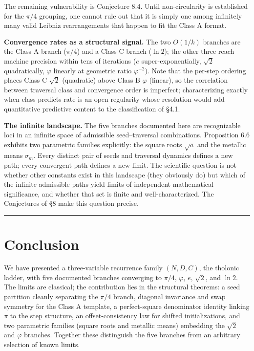 \documentclass[12pt]{article}
\begin{document}
The remaining vulnerability is Conjecture 8.4. Until non-circularity is
established for the \(\pi/4\) grouping, one cannot rule out that it is
simply one among infinitely many valid Leibniz rearrangements that
happen to fit the Class A format.

\textbf{Convergence rates as a structural signal.} The two \(O(1/k)\)
branches are the Class A branch (\(\pi/4\)) and a Class C branch
(\(\ln 2\)); the other three reach machine precision within tens of
iterations (\(e\) super-exponentially, \(\sqrt{2}\) quadratically,
\(\varphi\) linearly at geometric ratio \(\varphi^{-2}\)). Note that the
per-step ordering places Class C \(\sqrt{2}\) (quadratic) above Class B
\(\varphi\) (linear), so the correlation between traversal class and
convergence order is imperfect; characterizing exactly when class
predicts rate is an open regularity whose resolution would add
quantitative predictive content to the classification of §4.1.

\textbf{The infinite landscape.} The five branches documented here are
recognizable loci in an infinite space of admissible seed--traversal
combinations. Proposition 6.6 exhibits two parametric families
explicitly: the square roots \(\sqrt{a}\) and the metallic means
\(\sigma_m\). Every distinct pair of seeds and traversal dynamics
defines a new path; every convergent path defines a new limit. The
scientific question is not whether other constants exist in this
landscape (they obviously do) but which of the infinite admissible paths
yield limits of independent mathematical significance, and whether that
set is finite and well-characterized. The Conjectures of §8 make this
question precise.

\begin{center}\rule{0.5\linewidth}{0.5pt}\end{center}

\section{Conclusion}\label{conclusion}

We have presented a three-variable recurrence family \((N, D, C)\), the
tholonic ladder, with five documented branches converging to \(\pi/4\),
\(\varphi\), \(e\), \(\sqrt{2}\), and \(\ln 2\). The limits are
classical; the contribution lies in the structural theorems: a seed
partition cleanly separating the \(\pi/4\) branch, diagonal invariance
and swap symmetry for the Class A template, a perfect-square denominator
identity linking \(\pi\) to the step structure, an offset-consistency
law for shifted initializations, and two parametric families (square
roots and metallic means) embedding the \(\sqrt{2}\) and \(\varphi\)
branches. Together these distinguish the five branches from an arbitrary
selection of known limits.
\end{document}
